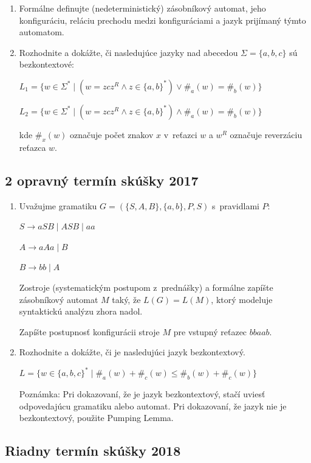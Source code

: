\documentclass[11pt,a4paper]{article}
\begin{document}
		\begin{enumerate}
			\item Formálne definujte (nedeterministický) zásobníkový automat, jeho konfiguráciu, reláciu prechodu medzi konfiguráciami a jazyk prijímaný týmto automatom.

			\item Rozhodnite a dokážte, či nasledujúce jazyky nad abecedou $\Sigma = \{a,b,c\}$ sú bezkontextové:
	
			$L_1 = \{w \in \Sigma^* \mid (w = zcz^R \land z \in \{a,b\}^*) \lor \#_a(w) = \#_b(w)\}$
	
			$L_2 = \{w \in \Sigma^* \mid (w = zcz^R \land z \in \{a,b\}^*) \land \#_a(w) = \#_b(w)\}$
	
			kde $\#_x(w)$ označuje počet znakov $x$ v~reťazci $w$ a $w^R$ označuje reverzáciu reťazca $w$.
		\end{enumerate}

		\subsection{2 opravný termín skúšky 2017}

		\begin{enumerate}
			\item Uvažujme gramatiku $G = (\{S,A,B\}, \{a,b\}, P, S)$ s~pravidlami $P$:

			$S \rightarrow aSB \mid ASB \mid aa$
	
			$A \rightarrow aAa \mid B$
	
			$B \rightarrow bb \mid A$
	
			Zostroje (systematickým postupom z~prednášky) a formálne zapíšte zásobníkový automat $M$ taký, že $L(G) = L(M)$, ktorý modeluje syntaktickú analýzu zhora nadol.
	
			Zapíšte postupnosť konfigurácii stroje $M$ pre vstupný reťazec $bbaab$.
	
			\item Rozhodnite a dokážte, či je nasledujúci jazyk bezkontextový.
	
			$L = \{w \in \{a,b,c\}^* \mid \#_a(w) + \#_c(w) \leq  \#_b(w) +  \#_c(w)\}$
	
			Poznámka: Pri dokazovaní, že je jazyk bezkontextový, stačí uviesť odpovedajúcu gramatiku alebo automat. Pri dokazovaní, že jazyk nie je bezkontextový, použite Pumping Lemma.
		\end{enumerate}

		\subsection{Riadny termín skúšky 2018}
\end{document}
